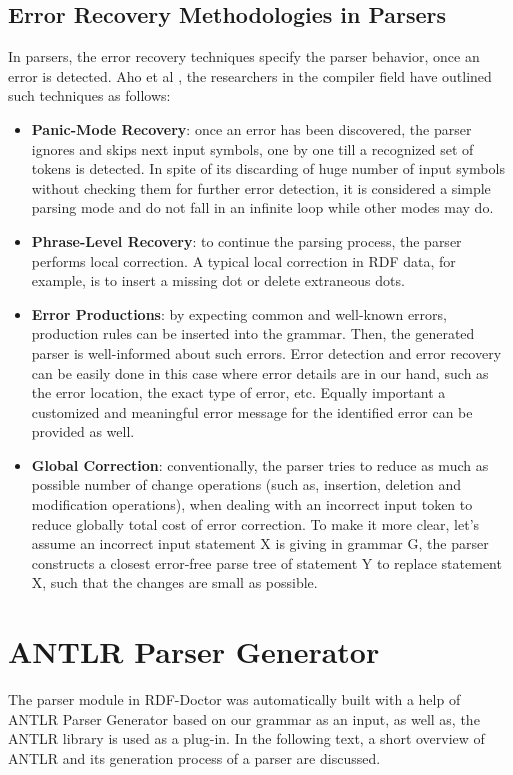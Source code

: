 \subsection{Error Recovery Methodologies in Parsers}
In parsers, the error recovery techniques specify the parser behavior, once an error is detected.  Aho et al \cite{Aho:2006}, the researchers in the compiler field    have outlined such techniques as follows:
\begin{itemize}
	\item \textbf{Panic-Mode Recovery}: once an error has been discovered, the parser ignores and skips next input symbols, one by one till a recognized set of tokens is detected. In spite of its discarding of huge number of input symbols without checking them for further error detection, it is considered a simple parsing mode and do not fall in an infinite loop while other modes may do.
	\item \textbf{Phrase-Level Recovery}: to continue the parsing process, the parser performs local correction. A typical local correction in RDF data, for example, is to insert a missing dot or delete extraneous dots.
	\item \textbf{Error Productions}: by expecting  common and well-known errors, production rules can be inserted into the grammar. Then, the generated parser is well-informed about such errors. Error detection and error recovery can be easily done in this case where error details are in our hand, such as the error location, the exact type of error, etc. Equally important a customized and meaningful error message for the identified error can be provided as well. 
	\item \textbf{Global Correction}: conventionally, the parser tries to reduce as much as possible number of change operations (such as, insertion, deletion and modification operations), when dealing with an incorrect input token to reduce globally total cost of error correction. To make it more clear, let's assume an incorrect input statement X is giving in grammar G, the parser constructs a closest error-free parse tree of statement Y to replace statement X, such that the changes are small as possible. 
\end{itemize}


\section{ANTLR Parser Generator}
The parser module in RDF-Doctor was automatically built with a help of ANTLR Parser Generator based on our grammar as an input, as well as,  the ANTLR library is used as a plug-in. In the following text, a short overview of ANTLR and its generation process of a parser are discussed.   
\label{sec:bck_ANTLR}

